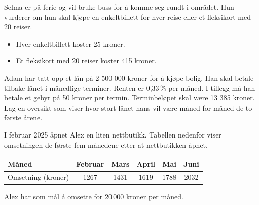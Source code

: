 Selma er på ferie og vil bruke buss for å komme seg rundt i området. Hun vurderer
om hun skal kjøpe en enkeltbillett for hver reise eller et fleksikort med 20 reiser.
\begin{itemize}
	\item Hver enkeltbillett koster 25 kroner.
	\item Et fleksikort med 20 reiser koster 415 kroner.
\end{itemize}

Adam har tatt opp et lån på 2 500 000 kroner for å kjøpe bolig.
Han skal betale tilbake lånet i månedlige terminer.
Renten er 0,33\,\% per måned. I tillegg må han betale et gebyr på 50 kroner per termin.
Terminbeløpet skal være 13 385 kroner.
Lag en oversikt som viser hvor stort lånet hans vil være måned for måned de to
første årene.

I februar 2025 åpnet Alex en liten
nettbutikk. Tabellen nedenfor viser omsetningen de første fem månedene etter
at nettbutikken åpnet.
\begin{table}[h]
	\centering
	\begin{tabular}{|l|c|c|c|c|c|}
		\hline
		Måned & Februar & Mars & April & Mai & Juni \\
		\hline
		Omsetning (kroner) & 1267 & 1431 & 1619 & 1788 & 2032 \\
		\hline
	\end{tabular}
\end{table}


Alex har som mål å omsette for 20\,000 kroner per måned.



